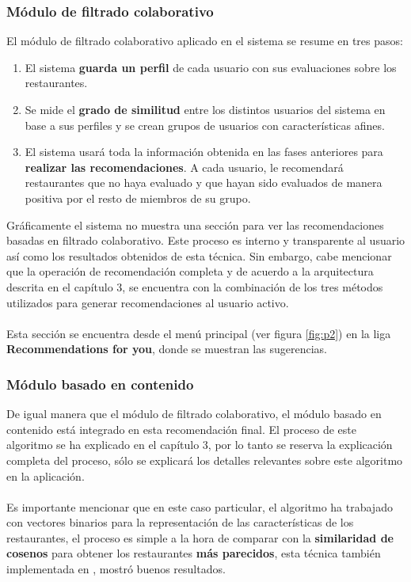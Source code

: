 \documentclass[12pt,letterpaper,oneside] {memoir}
\begin{document}
\subsubsection{Módulo de filtrado colaborativo}

El módulo de filtrado colaborativo aplicado en el sistema \citep{PerezCordon2008} se resume en tres pasos:
\begin{enumerate}
\item El sistema \textbf{guarda un perfil} de cada usuario con sus evaluaciones sobre los restaurantes.
\item Se mide el \textbf{grado de similitud} entre los distintos usuarios del sistema en base a sus perfiles y se crean grupos de usuarios con características afines.
\item El sistema usará toda la información obtenida en las fases anteriores para \textbf{realizar las recomendaciones}. A cada usuario, le recomendará restaurantes que no haya evaluado y que hayan sido evaluados de manera positiva por el resto de miembros de su grupo.
\end{enumerate}

Gráficamente el sistema no muestra una sección para ver las recomendaciones basadas en filtrado colaborativo. Este proceso es interno y transparente al usuario así como los resultados obtenidos de esta técnica. Sin embargo, cabe mencionar que la operación de recomendación completa y de acuerdo a la arquitectura descrita en el capítulo 3,  se encuentra con la combinación de los tres métodos utilizados para generar recomendaciones al usuario activo. 
\paragraph{}
Esta sección se encuentra desde el menú principal (ver figura \ref{fig:p2}) en la liga \textbf{Recommendations for you}, donde se muestran las sugerencias.

\subsubsection{Módulo basado en contenido}

De igual manera que el módulo de filtrado colaborativo, el módulo basado en contenido está integrado en esta recomendación final. El proceso de este algoritmo se ha explicado en el capítulo 3, por lo tanto se reserva la explicación completa del proceso, sólo se explicará los detalles relevantes sobre este algoritmo en la aplicación.
\paragraph{}
Es importante mencionar que en este caso particular, el algoritmo ha trabajado con vectores binarios para la representación de las características de los restaurantes, el proceso es simple a la hora de comparar con la \textbf{similaridad de cosenos} para obtener  los restaurantes \textbf{más parecidos}, esta técnica también implementada en \citep{Burke2002}, mostró buenos resultados.  
\end{document}
